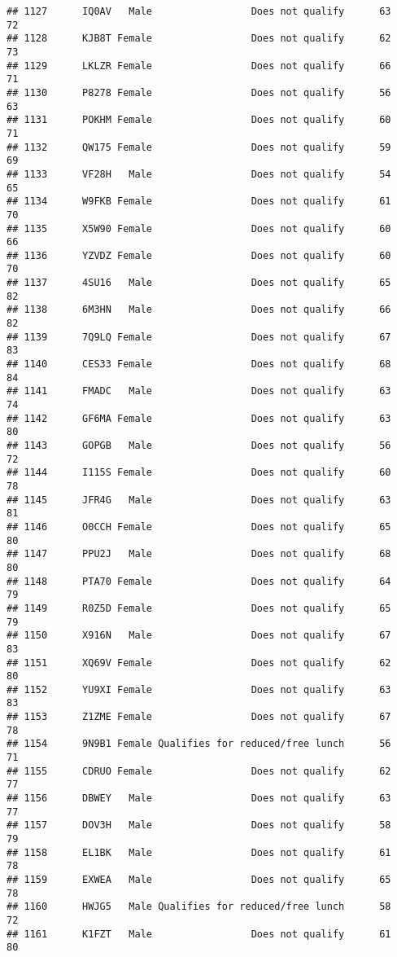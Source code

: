 \documentclass[
]{article}
\begin{document}
\begin{verbatim}
## 1127      IQ0AV   Male                 Does not qualify      63       72
## 1128      KJB8T Female                 Does not qualify      62       73
## 1129      LKLZR Female                 Does not qualify      66       71
## 1130      P8278 Female                 Does not qualify      56       63
## 1131      POKHM Female                 Does not qualify      60       71
## 1132      QW175 Female                 Does not qualify      59       69
## 1133      VF28H   Male                 Does not qualify      54       65
## 1134      W9FKB Female                 Does not qualify      61       70
## 1135      X5W90 Female                 Does not qualify      60       66
## 1136      YZVDZ Female                 Does not qualify      60       70
## 1137      4SU16   Male                 Does not qualify      65       82
## 1138      6M3HN   Male                 Does not qualify      66       82
## 1139      7Q9LQ Female                 Does not qualify      67       83
## 1140      CES33 Female                 Does not qualify      68       84
## 1141      FMADC   Male                 Does not qualify      63       74
## 1142      GF6MA Female                 Does not qualify      63       80
## 1143      GOPGB   Male                 Does not qualify      56       72
## 1144      I115S Female                 Does not qualify      60       78
## 1145      JFR4G   Male                 Does not qualify      63       81
## 1146      O0CCH Female                 Does not qualify      65       80
## 1147      PPU2J   Male                 Does not qualify      68       80
## 1148      PTA70 Female                 Does not qualify      64       79
## 1149      R0Z5D Female                 Does not qualify      65       79
## 1150      X916N   Male                 Does not qualify      67       83
## 1151      XQ69V Female                 Does not qualify      62       80
## 1152      YU9XI Female                 Does not qualify      63       83
## 1153      Z1ZME Female                 Does not qualify      67       78
## 1154      9N9B1 Female Qualifies for reduced/free lunch      56       71
## 1155      CDRUO Female                 Does not qualify      62       77
## 1156      DBWEY   Male                 Does not qualify      63       77
## 1157      DOV3H   Male                 Does not qualify      58       79
## 1158      EL1BK   Male                 Does not qualify      61       78
## 1159      EXWEA   Male                 Does not qualify      65       78
## 1160      HWJG5   Male Qualifies for reduced/free lunch      58       72
## 1161      K1FZT   Male                 Does not qualify      61       80

\end{verbatim}
\end{document}
